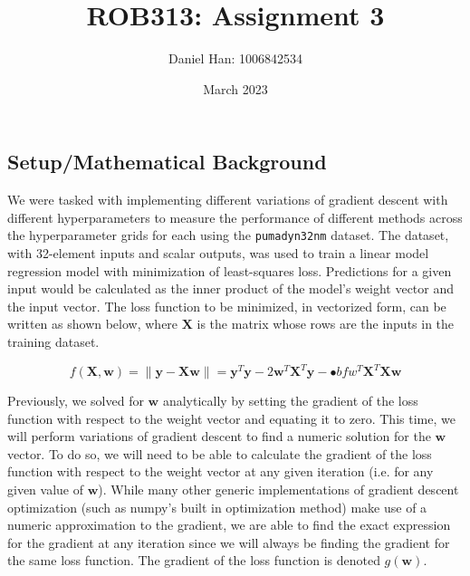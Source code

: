 

\title{ROB313: Assignment 3}
\author{Daniel Han: 1006842534}
\date{March 2023}



\maketitle


\subsection{Setup/Mathematical Background}
We were tasked with implementing different variations of gradient descent with different hyperparameters to measure the performance of different methods across the hyperparameter grids for each using the \verb+pumadyn32nm+ dataset. The dataset, with 32-element inputs and scalar outputs, was used to train a linear model regression model with minimization of least-squares loss. Predictions for a given input would be calculated as the inner product of the model's weight vector and the input vector. The loss function to be minimized, in vectorized form, can be written as shown below, where $\mathbf{X}$ is the matrix whose rows are the inputs in the training dataset.

\begin{equation}
f(\mathbf{X}, \mathbf{w}) = \| \mathbf{y} - \mathbf{X}\mathbf{w} \| = \mathbf{y}^{T} \mathbf{y} - 2\mathbf{w}^{T} \mathbf{X}^{T} \mathbf{y} - \mathbf{•}bf{w}^{T} \mathbf{X}^{T} \mathbf{X}\mathbf{w}
\end{equation}

Previously, we solved for $\mathbf{w}$ analytically by setting the gradient of the loss function with respect to the weight vector and equating it to zero. This time, we will perform variations of gradient descent to find a numeric solution for the $\mathbf{w}$ vector. To do so, we will need to be able to calculate the gradient of the loss function with respect to the weight vector at any given iteration (i.e. for any given value of $\mathbf{w}$). While many other generic implementations of gradient descent optimization (such as numpy's built in optimization method) make use of a numeric approximation to the gradient, we are able to find the exact expression for the gradient at any iteration since we will always be finding the gradient for the same loss function. The gradient of the loss function is denoted $g(\mathbf{w})$.

